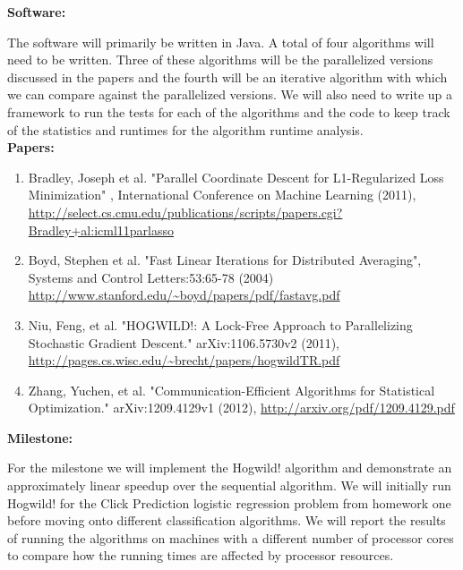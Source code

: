 \documentclass{article}
\begin{document}
		
\textbf{Software:}

	The software will primarily be written in Java.  A total of four algorithms will need to be written.  Three of these algorithms will be the parallelized versions discussed in the papers and the fourth will be an iterative algorithm with which we can compare against the parallelized versions. We will also need to write up a framework to run the tests for each of the algorithms and the code to keep track of the statistics and runtimes for the algorithm runtime analysis. \\
\textbf{Papers:}
	\begin{enumerate}
		\item Bradley, Joseph et al. "Parallel Coordinate Descent for L1-Regularized Loss Minimization" , International Conference on Machine Learning (2011), 
			\url{http://select.cs.cmu.edu/publications/scripts/papers.cgi?Bradley+al:icml11parlasso}
		\item Boyd, Stephen et al. "Fast Linear Iterations for Distributed Averaging", Systems and Control Letters:53:65-78 (2004)
			\url{http://www.stanford.edu/~boyd/papers/pdf/fastavg.pdf}
		\item Niu, Feng, et al. "HOGWILD!: A Lock-Free Approach to Parallelizing Stochastic Gradient Descent." arXiv:1106.5730v2 (2011), 
			\url{http://pages.cs.wisc.edu/~brecht/papers/hogwildTR.pdf}	
		\item Zhang, Yuchen, et al. "Communication-Efficient Algorithms for Statistical Optimization." arXiv:1209.4129v1 (2012), 
			\url{http://arxiv.org/pdf/1209.4129.pdf}
	\end{enumerate}
\textbf{Milestone:}

For the milestone we will implement the Hogwild! algorithm and demonstrate an approximately linear speedup over the sequential algorithm.  We will initially run Hogwild! for the Click Prediction logistic regression problem from homework one before moving onto different classification algorithms. We will report the results of running the algorithms on machines with a different number of processor cores to compare how the running times are affected by processor resources.
\end{document}
